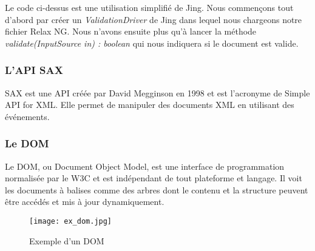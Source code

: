 \par
Le code ci-dessus est une utilisation simplifié de Jing. Nous commençons tout d'abord par créer un \emph{ValidationDriver} de Jing dans lequel nous chargeons notre fichier Relax NG. Nous n'avons ensuite plus qu'à lancer la méthode \emph{validate(InputSource in) : boolean} qui nous indiquera si le document est valide.


\subsubsection{L'API SAX}

SAX est une API créée par David Megginson en 1998 et est l'acronyme de Simple API for XML. Elle permet de manipuler des documents XML en utilisant des événements.


\subsubsection{Le DOM}
Le DOM, ou Document Object Model, est une interface de programmation normalisée par le W3C et est indépendant de tout plateforme et langage. Il voit les documents à balises comme des arbres dont le contenu et la structure peuvent être accédés et mis à jour dynamiquement.

\begin{figure}[!h]
\centering
\texttt{[image: ex\_dom.jpg]}\\[1cm]
\caption{Exemple d'un DOM}
\label{Exemple d'un DOM}
\end{figure}
